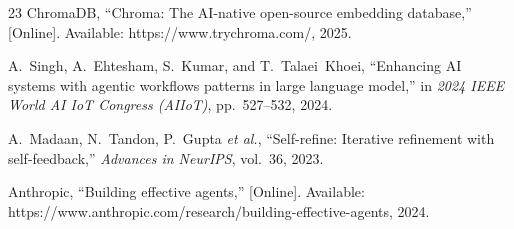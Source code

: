 \documentclass[conference]{IEEEtran}
\begin{document}
\begin{thebibliography}{23}
ChromaDB, ``Chroma: The AI-native open-source embedding database,'' [Online]. Available: https://www.trychroma.com/, 2025.

A.~Singh, A.~Ehtesham, S.~Kumar, and T.~Talaei~Khoei, ``Enhancing AI systems with agentic workflows patterns in large language model,'' in \textit{2024 IEEE World AI IoT Congress (AIIoT)}, pp.~527--532, 2024.

A.~Madaan, N.~Tandon, P.~Gupta \textit{et al.}, ``Self-refine: Iterative refinement with self-feedback,'' \textit{Advances in NeurIPS}, vol.~36, 2023.

Anthropic, ``Building effective agents,'' [Online]. Available: https://www.anthropic.com/research/building-effective-agents, 2024.

\end{thebibliography}
\end{document}
